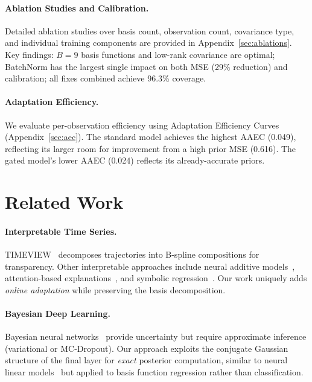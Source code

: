 \documentclass[final]{article}
\begin{document}
\paragraph{Ablation Studies and Calibration.} Detailed ablation studies over basis count, observation count, covariance type, and individual training components are provided in Appendix~\ref{sec:ablations}. Key findings: $B=9$ basis functions and low-rank covariance are optimal; BatchNorm has the largest single impact on both MSE (29\% reduction) and calibration; all fixes combined achieve 96.3\% coverage.

\paragraph{Adaptation Efficiency.} We evaluate per-observation efficiency using Adaptation Efficiency Curves (Appendix~\ref{sec:aec}). The standard model achieves the highest AAEC (0.049), reflecting its larger room for improvement from a high prior MSE (0.616). The gated model's lower AAEC (0.024) reflects its already-accurate priors.

\section{Related Work}
\label{sec:related}

\paragraph{Interpretable Time Series.} TIMEVIEW~\citep{kacprzyk2024towards} decomposes trajectories into B-spline compositions for transparency. Other interpretable approaches include neural additive models~\citep{agarwal2021neural}, attention-based explanations~\citep{lim2021temporal}, and symbolic regression~\citep{udrescu2020ai}. Our work uniquely adds \emph{online adaptation} while preserving the basis decomposition.

\paragraph{Bayesian Deep Learning.} Bayesian neural networks~\citep{blundell2015weight, gal2016dropout} provide uncertainty but require approximate inference (variational or MC-Dropout). Our approach exploits the conjugate Gaussian structure of the final layer for \emph{exact} posterior computation, similar to neural linear models~\citep{snoek2015scalable, riquelme2018deep} but applied to basis function regression rather than classification.
\end{document}

